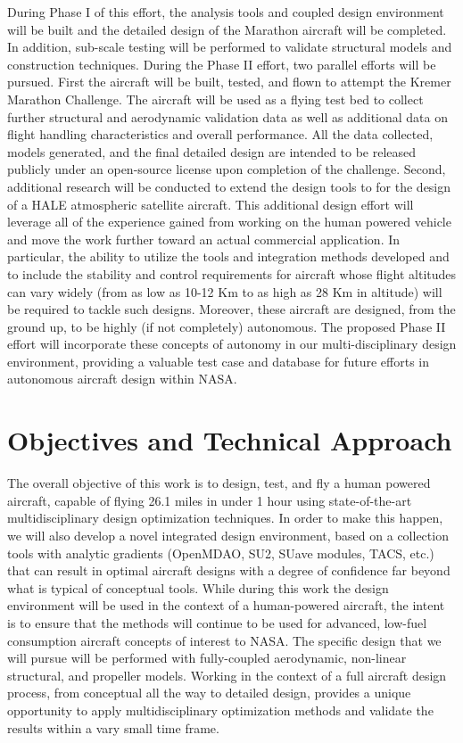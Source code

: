 \documentclass[]{aiaa-tc}
\begin{document}
    During Phase I of this effort, the analysis tools and coupled design environment will be built and 
    the detailed design of the Marathon aircraft will be completed. In addition, sub-scale testing will be 
    performed to validate structural models and construction techniques. During the Phase II effort, two 
    parallel efforts will be pursued. First the aircraft will be built, tested, and flown to attempt the Kremer Marathon Challenge. 
    The aircraft will be used as a flying test bed to collect further structural and aerodynamic validation data as well 
    as additional data on flight handling characteristics and overall performance. All the data collected, 
    models generated, and the final detailed design are intended to be released publicly under an open-source license
    upon completion of the challenge. Second, additional research will be conducted to extend the design tools to 
    for the design of a HALE atmospheric satellite aircraft. This additional design effort will leverage all of the experience 
    gained from working on the human powered vehicle and move the work further toward an actual commercial application.   In particular, the ability to utilize the tools and integration methods developed and to include the stability and control requirements for aircraft whose flight altitudes can vary widely (from as low as 10-12 Km to as high as 28 Km in altitude) will be required to tackle such designs.  Moreover, these aircraft are designed, from the ground up, to be highly (if not completely) autonomous.  The proposed Phase II effort will incorporate these concepts of autonomy in our multi-disciplinary design environment, providing a valuable test case and database for future efforts in autonomous aircraft design within NASA.

  \section{Objectives and Technical Approach}

    The overall objective of this work is to design, test, and fly a human powered aircraft, 
    capable of flying 26.1 miles in under 1 hour using state-of-the-art multidisciplinary 
    design optimization techniques. In order to make this happen, we will also develop a novel integrated 
    design environment, based on a collection tools with analytic gradients (OpenMDAO, SU2, SUave 
    modules, TACS, etc.) that can result in optimal aircraft designs with a degree of confidence far beyond 
    what is typical of conceptual tools.   While during this work the design environment will be used in the 
    context of a human-powered aircraft,  the intent is to ensure that the methods will continue to be used 
    for advanced, low-fuel consumption aircraft concepts of interest to NASA.  The specific design that we will 
    pursue will be performed with fully-coupled aerodynamic, non-linear structural, and propeller models. Working 
    in the context of a full aircraft design process, from conceptual all the way to detailed design, 
    provides a unique opportunity to apply multidisciplinary optimization methods and validate
    the results within a vary small time frame. 
\end{document}
